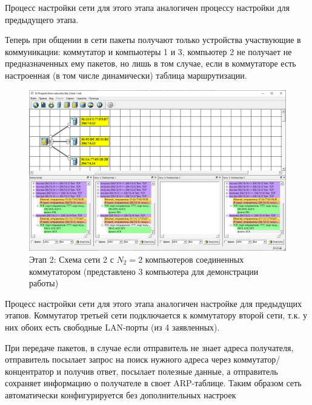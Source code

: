 
Процесс настройки сети для этого этапа аналогичен процессу настройки для  предыдущего этапа. 

Теперь при общении в сети пакеты получают только устройства участвующие в коммуникации: коммутатор и компьютеры 1 и 3, компьютер 2 не получает не предназначенных ему пакетов, но лишь в том случае, если в коммутаторе есть настроенная (в том числе динамически) таблица маршрутизации.

\begin{figure}[H]
    \centering
    \includegraphics[width=1\linewidth]{res/task-2.png}
    \caption{Этап 2: Схема сети 2 с $N_2=2$ компьютеров соединенных коммутатором (представлено 3 компьютера для демонстрации работы)}
    \label{fig:task-2}
\end{figure}


Процесс настройки сети для этого этапа аналогичен настройке для предыдущих этапов. Коммутатор третьей сети подключается к коммутатору второй сети, т.к. у них обоих есть свободные LAN-порты (из 4 заявленных).

При передаче пакетов, в случае если отправитель не знает адреса получателя, отправитель посылает запрос на поиск нужного адреса через коммутатор/концентратор и получив ответ, посылает полезные данные, а отправитель сохраняет информацию о получателе в своет ARP-таблице. Таким образом сеть автоматически конфигурируется без дополнительных настроек


